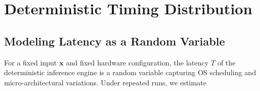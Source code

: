 \documentclass[11pt]{article}
\begin{document}
\section{Deterministic Timing Distribution}

\subsection{Modeling Latency as a Random Variable}

For a fixed input $\bm{x}$ and fixed hardware configuration, the latency $T$ of the deterministic inference engine is a random variable capturing OS scheduling and micro-architectural variations. Under repeated runs, we estimate
\nocite{*}


\end{document}

